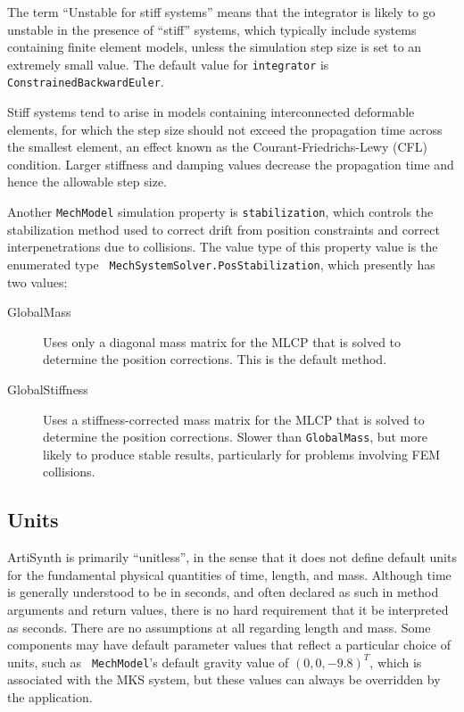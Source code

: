 The term ``Unstable for stiff systems'' means that the integrator is
likely to go unstable in the presence of ``stiff'' systems, which
typically include systems containing finite element models, unless the
simulation step size is set to an extremely small value.  The default
value for {\tt integrator} is {\tt ConstrainedBackwardEuler}.

\begin{sideblock}
Stiff systems tend to arise in models containing interconnected
deformable elements, for which the step size should not exceed the
propagation time across the smallest element, an effect known as the
Courant-Friedrichs-Lewy (CFL) condition. Larger stiffness and damping
values decrease the propagation time and hence the allowable step
size.
\end{sideblock}

Another {\tt MechModel} simulation property is {\tt stabilization},
which controls the stabilization method used to correct drift from
position constraints and correct interpenetrations due to collisions.
The value type of this property value is the enumerated type {\tt
MechSystemSolver.PosStabilization}, which presently has two values:

\begin{description}

\item[GlobalMass]\mbox{}

Uses only a diagonal mass matrix for the MLCP that is solved to
determine the position corrections. This is the default method.

\item[GlobalStiffness]\mbox{}

Uses a stiffness-corrected mass matrix for the MLCP that is solved to
determine the position corrections. Slower than {\tt GlobalMass}, but
more likely to produce stable results, particularly for
problems involving FEM collisions.

\end{description}

\subsection{Units}
\label{sec:mechii:units}

ArtiSynth is primarily ``unitless'', in the sense that it does not
define default units for the fundamental physical quantities of time,
length, and mass. Although time is
generally understood to be in seconds, and often declared as such in
method arguments and return values, there is no hard requirement that
it be interpreted as seconds. There are no assumptions at all
regarding length and mass. Some components may have default parameter
values that reflect a particular choice of units, such as {\tt
MechModel}'s default gravity value of $(0, 0, -9.8)^T$, which is
associated with the MKS system, but these values can always be
overridden by the application.

